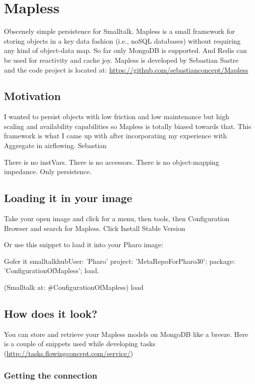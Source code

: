 \documentclass[a4paper,10pt,twoside]{book}
\begin{document}
\fi
\sloppy

\chapter{Mapless}
Obscenely simple persistence for Smalltalk. Mapless is a small framework for storing objects in a key \ct{-$>$} data fashion (i.e., noSQL databases) without requiring any kind of object-data map. So far only MongoDB is supported. And Redis can be used for reactivity and cache joy.
Mapless is developed by Sebastian Sastre and the code project is located at: \url{https://github.com/sebastianconcept/Mapless}
\section{Motivation}
I wanted to persist objects with low friction and low maintenance but high scaling and availability capabilities so Mapless is totally biased towards that. This framework is what I came up with after incorporating my experience with Aggregate in airflowing. Sebastian

There is no instVars. There is no accessors. There is no object-mapping impedance. Only persistence.
\section{Loading it in your image}
Take your open image and click for a menu, then tools, then Configuration Browser and search for Mapless. Click Install Stable Version

Or use this snippet to load it into your Pharo image:


\begin{code}{}
Gofer it 
    smalltalkhubUser: 'Pharo'
    project: 'MetaRepoForPharo30'; 
    package: 'ConfigurationOfMapless';
    load.

(Smalltalk at: #ConfigurationOfMapless) load
\end{code}

\section{How does it look?}
You can store and retrieve your Mapless models on MongoDB like a breeze. Here is a couple of snippets used while developing tasks (\url{http://tasks.flowingconcept.com/service/})
\subsection{Getting the connection}
\end{document}
